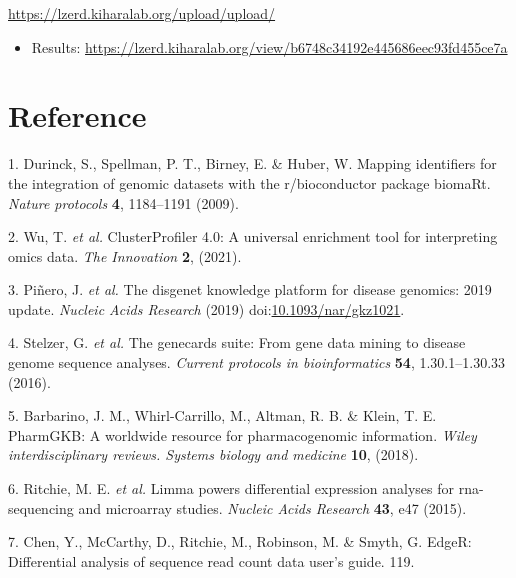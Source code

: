 \documentclass[
]{article}
\providecommand{\tightlist}{%
  \setlength{\itemsep}{0pt}\setlength{\parskip}{0pt}}
\newenvironment{cslreferences}%
  {}%
  {\par}
\begin{document}
\url{https://lzerd.kiharalab.org/upload/upload/}

\begin{itemize}
\tightlist
\item
  Results:
  \url{https://lzerd.kiharalab.org/view/b6748c34192e445686eec93fd455ce7a}
\end{itemize}

\hypertarget{bibliography}{%
\section*{Reference}\label{bibliography}}

\hypertarget{refs}{}
\begin{cslreferences}
\leavevmode\hypertarget{ref-MappingIdentifDurinc2009}{}%
1. Durinck, S., Spellman, P. T., Birney, E. \& Huber, W. Mapping identifiers for the integration of genomic datasets with the r/bioconductor package biomaRt. \emph{Nature protocols} \textbf{4}, 1184--1191 (2009).

\leavevmode\hypertarget{ref-ClusterprofilerWuTi2021}{}%
2. Wu, T. \emph{et al.} ClusterProfiler 4.0: A universal enrichment tool for interpreting omics data. \emph{The Innovation} \textbf{2}, (2021).

\leavevmode\hypertarget{ref-TheDisgenetKnPinero2019}{}%
3. Piñero, J. \emph{et al.} The disgenet knowledge platform for disease genomics: 2019 update. \emph{Nucleic Acids Research} (2019) doi:\href{https://doi.org/10.1093/nar/gkz1021}{10.1093/nar/gkz1021}.

\leavevmode\hypertarget{ref-TheGenecardsSStelze2016}{}%
4. Stelzer, G. \emph{et al.} The genecards suite: From gene data mining to disease genome sequence analyses. \emph{Current protocols in bioinformatics} \textbf{54}, 1.30.1--1.30.33 (2016).

\leavevmode\hypertarget{ref-PharmgkbAWorBarbar2018}{}%
5. Barbarino, J. M., Whirl-Carrillo, M., Altman, R. B. \& Klein, T. E. PharmGKB: A worldwide resource for pharmacogenomic information. \emph{Wiley interdisciplinary reviews. Systems biology and medicine} \textbf{10}, (2018).

\leavevmode\hypertarget{ref-LimmaPowersDiRitchi2015}{}%
6. Ritchie, M. E. \emph{et al.} Limma powers differential expression analyses for rna-sequencing and microarray studies. \emph{Nucleic Acids Research} \textbf{43}, e47 (2015).

\leavevmode\hypertarget{ref-EdgerDifferenChen}{}%
7. Chen, Y., McCarthy, D., Ritchie, M., Robinson, M. \& Smyth, G. EdgeR: Differential analysis of sequence read count data user's guide. 119.


\end{cslreferences}
\end{document}
